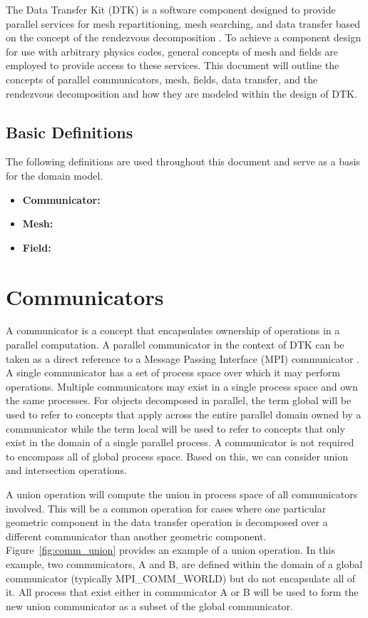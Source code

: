 \documentclass[letterpaper,12pt]{article}
\begin{document}
The Data Transfer Kit (DTK) is a software component designed to
provide parallel services for mesh repartitioning, mesh searching, and
data transfer based on the concept of the rendezvous decomposition
\cite{Plimpton_2004}. To achieve a component design for use with
arbitrary physics codes, general concepts of mesh and fields are
employed to provide access to these services. This document will
outline the concepts of parallel communicators, mesh, fields, data
transfer, and the rendezvous decomposition and how they are modeled
within the design of DTK.

\subsection{Basic Definitions}\label{subsec:basic_defs}

The following definitions are used throughout this document and serve
as a basis for the domain model.

\begin{itemize}
  \item {\bf Communicator:}
  \item {\bf Mesh:}
  \item {\bf Field:}
\end{itemize}

\clearpage

\section{Communicators}\label{sec:communicators}
A communicator is a concept that encapsulates ownership of operations
in a parallel computation. A parallel communicator in the context of
DTK can be taken as a direct reference to a Message Passing Interface
(MPI) communicator \cite{MPI_1994}. A single communicator has a set of
process space over which it may perform operations. Multiple
communicators may exist in a single process space and own the same
processes. For objects decomposed in parallel, the term global will be
used to refer to concepts that apply across the entire parallel domain
owned by a communicator while the term local will be used to refer to
concepts that only exist in the domain of a single parallel process. A
communicator is not required to encompass all of global process
space. Based on this, we can consider union and intersection
operations.

A union operation will compute the union in process space of all
communicators involved. This will be a common operation for cases
where one particular geometric component in the data transfer
operation is decomposed over a different communicator than another
geometric component. Figure~\ref{fig:comm_union} provides an example
of a union operation. In this example, two communicators, A and B, are
defined within the domain of a global communicator (typically
MPI\_COMM\_WORLD) but do not encapsulate all of it. All process that
exist either in communicator A or B will be used to form the new union
communicator as a subset of the global communicator.
\end{document}

